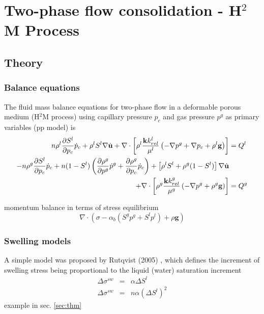 \section{Two-phase flow consolidation - H$^2$M Process}

\subsection{Theory}

\subsubsection{Balance equations}

The fluid mass balance equations for two-phase flow in a deformable porous medium (H$^2$M process) using capillary pressure $p_c$ and gas pressure $p^g$ as primary variables (pp model) is
%
\begin{align}
n \rho^l \dfrac{\partial S^l}{\partial p_c} \dot{p}_c
+
\rho^l S^l \nabla\dot{\mathbf u}
+
\nabla \cdot
\left[
\rho^{l}\dfrac{\mathbf k k_{rel}^{l}}{\mu^{l}}
\left(
-\nabla p^{g} + \nabla p_{c} + \rho^{l} \mathbf g
\right)
\right]
&=
Q^l
\\
-
n \rho^g \dfrac{\partial S^l}{\partial p_c} \dot{p}_c
+
n (1 -S^l)
\left(
\dfrac{\partial \rho^{g}}{\partial p^g}\dot{p}^g
+
\dfrac{\partial \rho^{g}}{\partial p_c}\dot{p}_c
\right)
+
\left[\rho^l S^l + \rho^g (1-S^l)\right] \nabla\dot{\mathbf u}
\nonumber\\
+
\nabla \cdot
\left[\rho^{g}\dfrac{\mathbf k k_{rel}^{g}}{\mu^{g}}
\left(-\nabla p^{g} + \rho^{g} \mathbf g\right)
\right]
&=
Q^g
\label{eqn:h2m}
\end{align}

momentum balance in terms of stress equilibrium
\begin{equation}
\nabla\cdot
\left(
\sigma -\alpha_b(S^g p^g + S^l p^l) + \rho\mathbf{g}
\right)
\end{equation}

\subsubsection{Swelling models}

A simple model was proposed by Rutqvist (2005) \cite{Jonny05}, which defines the increment of swelling stress being proportional to the liquid (water) saturation increment
\begin{eqnarray}
\Delta \sigma^{sw} & = & \alpha \Delta S^l
\\
\Delta \sigma^{sw} & = & n \alpha (\Delta S^l)^2
\label{eqn:swelling}
\end{eqnarray}
example in sec. \ref{sec:thm}

